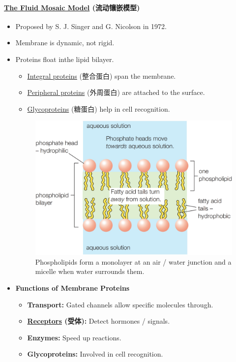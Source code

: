 \paragraph{\underline{The Fluid Mosaic Model} (流动镶嵌模型)}
\begin{itemize}
    \item Proposed by S. J. Singer and G. Nicolson in 1972.
    \item Membrane is dynamic, not rigid.
    \item Proteins float inthe lipid bilayer.
    \begin{itemize}
        \item \underline{Integral proteins} (整合蛋白) span the membrane.
        \item \underline{Peripheral proteins} (外周蛋白) are attached to the surface.
        \item \underline{Glycoproteins} (糖蛋白) help in cell recognition.
    \end{itemize}
    \begin{figure}[H]
        \centering
        \includegraphics[scale=0.15]{Biology/2A/Images/2A-1-3.png}
        \caption{Phospholipids form a monolayer at an air / water junction and a micelle when water surrounds them.}
    \end{figure}
    \item \textbf{Functions of Membrane Proteins}
    \begin{itemize}
        \item \textbf{Transport:} Gated channels allow specific molecules through.
        \item \textbf{\underline{Receptors} (受体):} Detect hormones / signals.
        \item \textbf{Enzymes:} Speed up reactions.
        \item \textbf{Glycoproteins:} Involved in cell recognition.
    \end{itemize}
\end{itemize}

